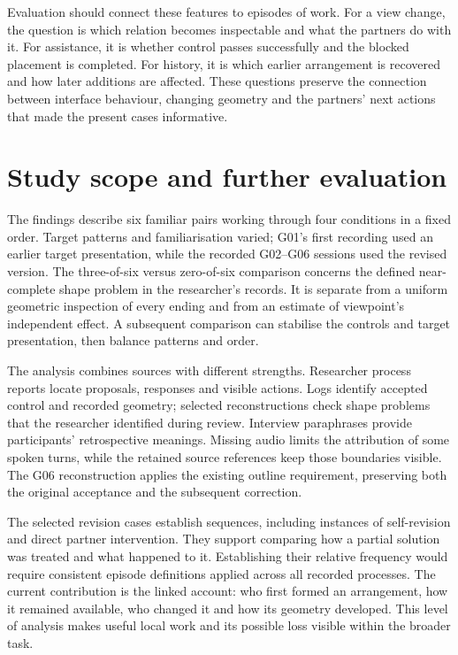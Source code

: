 Evaluation should connect these features to episodes of work. For a view change, the question is which relation becomes inspectable and what the partners do with it. For assistance, it is whether control passes successfully and the blocked placement is completed. For history, it is which earlier arrangement is recovered and how later additions are affected. These questions preserve the connection between interface behaviour, changing geometry and the partners' next actions that made the present cases informative.

\section{Study scope and further evaluation}\label{sec:6-5}

The findings describe six familiar pairs working through four conditions in a fixed order. Target patterns and familiarisation varied; G01's first recording used an earlier target presentation, while the recorded G02--G06 sessions used the revised version. The three-of-six versus zero-of-six comparison concerns the defined near-complete shape problem in the researcher's records. It is separate from a uniform geometric inspection of every ending and from an estimate of viewpoint's independent effect. A subsequent comparison can stabilise the controls and target presentation, then balance patterns and order.

The analysis combines sources with different strengths. Researcher process reports locate proposals, responses and visible actions. Logs identify accepted control and recorded geometry; selected reconstructions check shape problems that the researcher identified during review. Interview paraphrases provide participants' retrospective meanings. Missing audio limits the attribution of some spoken turns, while the retained source references keep those boundaries visible. The G06 reconstruction applies the existing outline requirement, preserving both the original acceptance and the subsequent correction.

The selected revision cases establish sequences, including instances of self-revision and direct partner intervention. They support comparing how a partial solution was treated and what happened to it. Establishing their relative frequency would require consistent episode definitions applied across all recorded processes. The current contribution is the linked account: who first formed an arrangement, how it remained available, who changed it and how its geometry developed. This level of analysis makes useful local work and its possible loss visible within the broader task.



